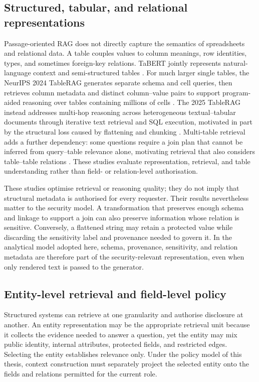 \subsection{Structured, tabular, and relational representations}

Passage-oriented RAG does not directly capture the semantics of spreadsheets and relational data. A table couples values to column meanings, row identities, types, and sometimes foreign-key relations. TaBERT jointly represents natural-language context and semi-structured tables \citep{yin2020tabert}. For much larger single tables, the NeurIPS 2024 TableRAG generates separate schema and cell queries, then retrieves column metadata and distinct column--value pairs to support program-aided reasoning over tables containing millions of cells \citep{chen2024milliontablerag}. The 2025 TableRAG instead addresses multi-hop reasoning across heterogeneous textual--tabular documents through iterative text retrieval and SQL execution, motivated in part by the structural loss caused by flattening and chunking \citep{yu2025heterotablerag}. Multi-table retrieval adds a further dependency: some questions require a join plan that cannot be inferred from query--table relevance alone, motivating retrieval that also considers table--table relations \citep{chen2024joinaware}. These studies evaluate representation, retrieval, and table understanding rather than field- or relation-level authorisation.

These studies optimise retrieval or reasoning quality; they do not imply that structural metadata is authorised for every requester. Their results nevertheless matter to the security model. A transformation that preserves enough schema and linkage to support a join can also preserve information whose relation is sensitive. Conversely, a flattened string may retain a protected value while discarding the sensitivity label and provenance needed to govern it. In the analytical model adopted here, schema, provenance, sensitivity, and relation metadata are therefore part of the security-relevant representation, even when only rendered text is passed to the generator.

\subsection{Entity-level retrieval and field-level policy}

Structured systems can retrieve at one granularity and authorise disclosure at another. An entity representation may be the appropriate retrieval unit because it collects the evidence needed to answer a question, yet the entity may mix public identity, internal attributes, protected fields, and restricted edges. Selecting the entity establishes relevance only. Under the policy model of this thesis, context construction must separately project the selected entity onto the fields and relations permitted for the current role.


